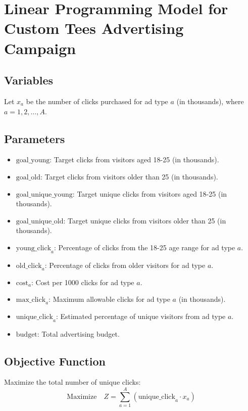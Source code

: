 \documentclass{article}
\begin{document}
\section*{Linear Programming Model for Custom Tees Advertising Campaign}

\subsection*{Variables}
Let \( x_a \) be the number of clicks purchased for ad type \( a \) (in thousands), where \( a = 1, 2, \ldots, A \).

\subsection*{Parameters}
\begin{itemize}
    \item \( \text{goal\_young} \): Target clicks from visitors aged 18-25 (in thousands).
    \item \( \text{goal\_old} \): Target clicks from visitors older than 25 (in thousands).
    \item \( \text{goal\_unique\_young} \): Target unique clicks from visitors aged 18-25 (in thousands).
    \item \( \text{goal\_unique\_old} \): Target unique clicks from visitors older than 25 (in thousands).
    \item \( \text{young\_click}_a \): Percentage of clicks from the 18-25 age range for ad type \( a \).
    \item \( \text{old\_click}_a \): Percentage of clicks from older visitors for ad type \( a \).
    \item \( \text{cost}_a \): Cost per 1000 clicks for ad type \( a \).
    \item \( \text{max\_click}_a \): Maximum allowable clicks for ad type \( a \) (in thousands).
    \item \( \text{unique\_click}_a \): Estimated percentage of unique visitors from ad type \( a \).
    \item \( \text{budget} \): Total advertising budget.
\end{itemize}

\subsection*{Objective Function}
Maximize the total number of unique clicks:
\[
\text{Maximize} \quad Z = \sum_{a=1}^{A} (\text{unique\_click}_a \cdot x_a)
\]
\end{document}
